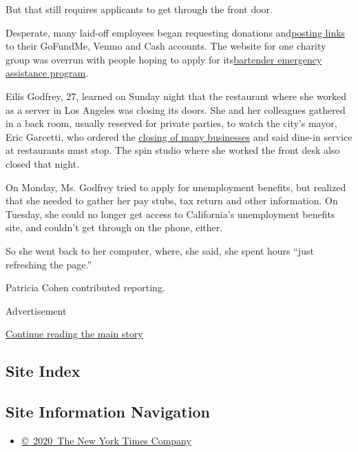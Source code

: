 But that still requires applicants to get through the front door.

Desperate, many laid-off employees began requesting donations
and\href{https://twitter.com/Whatapityonyou/status/1239639173843136512?s=20}{posting
links} to their GoFundMe, Venmo and Cash accounts. The website for one
charity group was overrun with people hoping to apply for
its\href{https://www.usbgfoundation.org/beap}{bartender emergency
assistance program}.

Eilís Godfrey, 27, learned on Sunday night that the restaurant where she
worked as a server in Los Angeles was closing its doors. She and her
colleagues gathered in a back room, usually reserved for private
parties, to watch the city's mayor, Eric Garcetti, who ordered the
\href{https://twitter.com/MayorOfLA/status/1239387832554106881?ref_src=twsrc\%5Etfw\%7Ctwcamp\%5Etweetembed\%7Ctwterm\%5E1239387832554106881\&ref_url=https\%3A\%2F\%2Fla.eater.com\%2F2020\%2F3\%2F15\%2F21180760\%2Flos-angeles-bar-restaurant-shutdown-order}{closing
of many businesses} and said dine-in service at restaurants must stop.
The spin studio where she worked the front desk also closed that night.

On Monday, Ms. Godfrey tried to apply for unemployment benefits, but
realized that she needed to gather her pay stubs, tax return and other
information. On Tuesday, she could no longer get access to California's
unemployment benefits site, and couldn't get through on the phone,
either.

So she went back to her computer, where, she said, she spent hours
``just refreshing the page.''

Patricia Cohen contributed reporting.

Advertisement

\protect\hyperlink{after-bottom}{Continue reading the main story}

\hypertarget{site-index}{%
\subsection{Site Index}\label{site-index}}

\hypertarget{site-information-navigation}{%
\subsection{Site Information
Navigation}\label{site-information-navigation}}

\begin{itemize}
\tightlist
\item
  \href{https://help.nytimes3xbfgragh.onion/hc/en-us/articles/115014792127-Copyright-notice}{©~2020~The
  New York Times Company}
\end{itemize}

